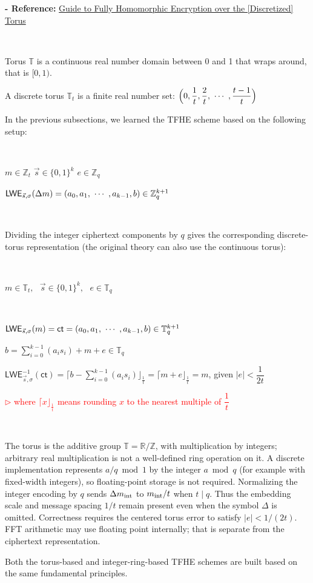 \textbf{- Reference:} 
\href{https://eprint.iacr.org/2021/1402.pdf}{Guide to
Fully Homomorphic Encryption
over the [Discretized] Torus}~\cite{torus}

$ $

Torus $\mathbb{T}$ is a continuous real number domain between 0 and 1 that wraps around, that is $[0, 1)$. 

A discrete torus $\mathbb{T}_t$ is a finite real number set: $\Big(0, \dfrac{1}{t}, \dfrac{2}{t}, \text{ } \text{$\cdots$} \text{ }, \dfrac{t - 1}{t}\Big)$


In the previous subsections, we learned the TFHE scheme based on the following setup:

$ $

$m \in \mathbb{Z}_t$ 
$\vec{s} \in \{0, 1\}^{k}$
$e \in \mathbb{Z}_q$

$\textsf{LWE}_{\vec{s}, \sigma}(\Delta m) = (a_0, a_1, \text{ } \text{$\cdots$} \text{ }, a_{k-1}, b) \in \mathbb{Z}_q^{k + 1}$

$ $

Dividing the integer ciphertext components by $q$ gives the corresponding discrete-torus representation (the original theory can also use the continuous torus):


$ $

$m \in \mathbb{T}_{t}, \text{ } \vec{s} \in \{0, 1\}^{k}, \text{ } e \in \mathbb{T}_{q}$

$ $

$\textsf{LWE}_{\vec{s}, \sigma}(m) = \textsf{ct} = (a_0, a_1, \text{ } \text{$\cdots$} \text{ }, a_{k-1}, b) \in \mathbb{T}_{q}^{k+1}$

$b = \sum\limits_{i=0}^{k-1}(a_is_i) + m + e \in \mathbb{T}_q$

$\textsf{LWE}_{\vec{s}, \sigma}^{-1}(\textsf{ct}) =  \Big\lceil b - \sum\limits_{i=0}^{k-1}(a_is_i) \Big\rfloor_{\frac{1}{t}} = \Big\lceil m + e \Big\rfloor_{\frac{1}{t}} = m$, given $|e| < \dfrac{1}{2t}$

\textcolor{red}{ $\rhd$ where $\lceil x \rfloor_{\frac{1}{t}}$ means rounding $x$ to the nearest multiple of $\dfrac{1}{t}$}

$ $

The torus is the additive group $\mathbb T=\mathbb R/\mathbb Z$, with multiplication by integers; arbitrary real multiplication is not a well-defined ring operation on it. A discrete implementation represents $a/q\bmod1$ by the integer $a\bmod q$ (for example with fixed-width integers), so floating-point storage is not required. Normalizing the integer encoding by $q$ sends $\Delta m_{\rm int}$ to $m_{\rm int}/t$ when $t\mid q$. Thus the embedding scale and message spacing $1/t$ remain present even when the symbol $\Delta$ is omitted. Correctness requires the centered torus error to satisfy $|e|<1/(2t)$. FFT arithmetic may use floating point internally; that is separate from the ciphertext representation.

Both the torus-based and integer-ring-based TFHE schemes are built based on the same fundamental principles.